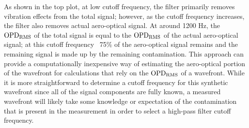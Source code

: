 As shown in the top plot, at low cutoff frequency, the filter primarily removes vibration effects from the total signal; however, as the cutoff frequency increases, the filter also removes actual aero-optical signal.
At around 1200 Hz, the $\operatorname{OPD_{RMS}}$ of the total signal is equal to the $\operatorname{OPD_{RMS}}$ of the actual aero-optical signal; at this cutoff frequency ~75\% of the aero-optical signal remains and the remaining signal is made up by the remaining contamination.
This approach can provide a computationally inexpensive way of estimating the aero-optical portion of the wavefront for calculations that rely on the $\operatorname{OPD_{RMS}}$ of a wavefront.
While it is more straightforward to determine a cutoff frequency for this synthetic wavefront since all of the signal components are fully known, a measured wavefront will likely take some knowledge or expectation of the contamination that is present in the measurement in order to select a high-pass filter cutoff frequency.

% 

